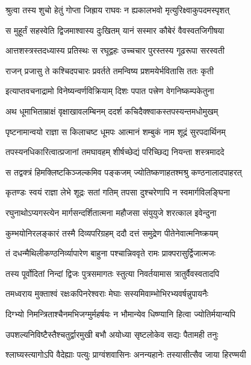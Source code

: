\twolineshloka
{श्रुत्वा तस्य शुचो हेतुं गोप्ता जिह्राय राघवः}
{न ह्यकालभवो मृत्युरिक्ष्वाकुपदमस्पृशत्} %

\twolineshloka
{स मुहूर्तं सहस्वेति द्विजमाश्वास्य दुःखितम्}
{यानं सस्मार कौबेरं वैवस्वतजिगीषया} %

\twolineshloka
{आत्तशस्त्रस्तदध्यास्य प्रतिस्थः स रघूद्वहः}
{उच्चचार पुरस्तस्य गूढरूपा सरस्वती} %

\twolineshloka
{राजन् प्रजासु ते कश्चिदपचारः प्रवर्तते}
{तमन्विष्य प्रशमयेर्भवितासि ततः कृती} %

\twolineshloka
{इत्याप्तवचनाद्रामो विनेष्यन्वर्णविक्रियाम्}
{दिशः पपात पत्त्रेण वेगनिष्कम्पकेतुना} %

\twolineshloka
{अथ धूमाभिताम्राक्षं वृक्षाखावलम्बिनम्}
{ददर्श कचिदैक्श्वाकस्तपस्यन्तमधोमुखम्} %

\twolineshloka
{पृष्टनामान्वयो राज्ञा स किलाचष्ट धूमपः}
{आत्मानं शम्बुकं नाम शूद्रं सुरपदार्थिनम्} %

\twolineshloka
{तपस्यनधिकारित्वात्प्रजानां तमघावहम्}
{शीर्षच्छेद्यं परिच्छिद्य नियन्ता शस्त्रमाददे} %

\twolineshloka
{स तद्वक्त्रं हिमक्लिष्टकिञ्जल्कमिव पङ्कजम्}
{ज्योतिष्कणाहतश्मश्रु कण्ठनालादपाहरत्} %

\twolineshloka
{कृतण्डः स्वयं राज्ञा लेभे शूद्रः सतां गतिम्}
{तपसा दुश्चरेणापि न स्वमार्गविलङ्घिना} %

\twolineshloka
{रघुनाथोऽप्यगस्त्येन मार्गसन्दर्शितात्मना}
{महौजसा संयुयुजे शरत्काल इवेन्दुना} %

\twolineshloka
{कुम्भयोनिरलङ्कारं तस्मै दिव्यपरिग्रहम्}
{ददौ दत्तं समुद्रेण पीतेनेवात्मनिष्क्रयम्} %

\twolineshloka
{तं दधन्मैथिलीकण्ठनिर्व्यापारेण बाहुना}
{पश्चान्निववृते रामः प्राक्परासुर्द्विजात्मजः} %

\twolineshloka
{तस्य पूर्वोदितां निन्दां द्विजः पुत्रसमागतः}
{स्तुत्या निवर्तयामास त्रातुर्वैवस्वतादपि} %

\twolineshloka
{तमध्वराय मुक्ताश्वं रक्षःकपिनरेश्वराः}
{मेघाः सस्यमिवाम्भोभिरभ्यवर्षन्नुपायनैः} %

\twolineshloka
{दिग्भ्यो निमन्त्रिताश्चैनमभिजग्मुर्महर्षयः}
{न भौमान्येव धिष्ण्यानि हित्वा ज्योतिर्मयान्यपि} %

\twolineshloka
{उपशल्यनिविष्टैस्तैश्चतुर्द्वारमुखी बभौ}
{अयोध्या सृष्टलोकेव सद्यः पैतामही तनुः} %

\twolineshloka
{श्लाघ्यस्त्यागोऽपि वैदेह्याः पत्युः प्राग्वंशवासिनः}
{अनन्यहानेः तस्यासीत्सैव जाया हिरण्मयी} %

